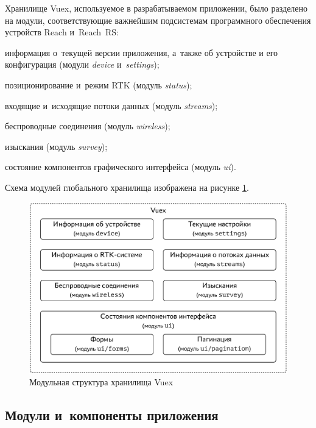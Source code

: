 
Хранилище Vuex, используемое в разрабатываемом приложении, было разделено на модули, соответствующие важнейшим подсистемам программного обеспечения устройств Reach и~Reach~RS:
\begin{dashitemize}
  \item информация о~текущей версии приложения, а~также об устройстве и его конфигурация (модули \emph{device} и~\emph{settings});
  \item позиционирование и~режим RTK (модуль \emph{status});
  \item входящие и~исходящие потоки данных (модуль \emph{streams});
  \item беспроводные соединения (модуль \emph{wireless});
  \item изыскания (модуль \emph{survey});
  \item состояние компонентов графического интерфейса (модуль \emph{ui}).
\end{dashitemize}

Схема модулей глобального хранилища изображена на рисунке \ref{fig:vuex-modules}.

\begin{figure}[h!]
  \centering
  \setlength{\fboxsep}{5pt}
  \includegraphics[width=.9\textwidth]{img/tikz/vuex-modules/pic}
  \vspace*{6pt}
  \caption{Модульная структура хранилища Vuex}\label{fig:vuex-modules}
\end{figure}



\subsection{Модули и~компоненты приложения}

